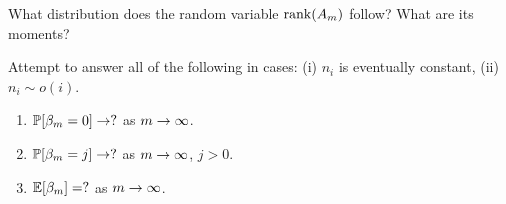 \begin{question} What distribution does the random variable
  $\operatorname{\mathrm{rank}}(A_m)$ follow? What are its moments?
\end{question}

\begin{conjecture}
  Attempt to answer all of the following in cases:
  (i) $n_i$ is eventually constant, (ii) $n_i \sim o(i)$.
  \begin{enumerate}
    \item $\mathbb{P}[\beta_m = 0] \rightarrow ?$ as $m \rightarrow \infty$.
    \item $\mathbb{P}[\beta_m = j] \rightarrow ?$ as $m \rightarrow \infty$, $j>0$.
    \item $\mathbb{E}[\beta_m] = ?$ as $m \rightarrow \infty$.
  \end{enumerate}
\end{conjecture}

